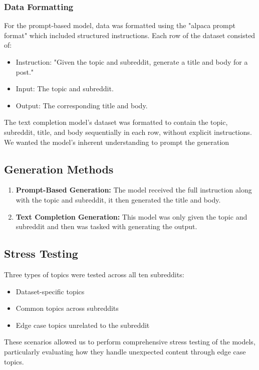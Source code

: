 \documentclass{article}
\begin{document}
\subsubsection{Data Formatting}
For the prompt-based model, data was formatted using the "alpaca prompt format" which included structured instructions. Each row of the dataset consisted of:
\begin{itemize}
    \item Instruction: "Given the topic and subreddit, generate a title and body for a post."
    \item Input: The topic and subreddit.
    \item Output: The corresponding title and body.
\end{itemize}

The text completion model's dataset was formatted to contain the topic, subreddit, title, and body sequentially in each row, without explicit instructions. We wanted the model's inherent understanding to prompt the generation

\subsection{Generation Methods}
\begin{enumerate}
    \item \textbf{Prompt-Based Generation:} The model received the full instruction along with the topic and subreddit, it then generated the title and body.
    \item \textbf{Text Completion Generation:} This model was only given the topic and subreddit and then was tasked with generating the output.
\end{enumerate}

\subsection{Stress Testing}
Three types of topics were tested across all ten subreddits:
\begin{itemize}
    \item Dataset-specific topics
    \item Common topics across subreddits
    \item Edge case topics unrelated to the subreddit
\end{itemize}
These scenarios allowed us to perform comprehensive stress testing of the models, particularly evaluating how they handle unexpected content through edge case topics.
\end{document}
